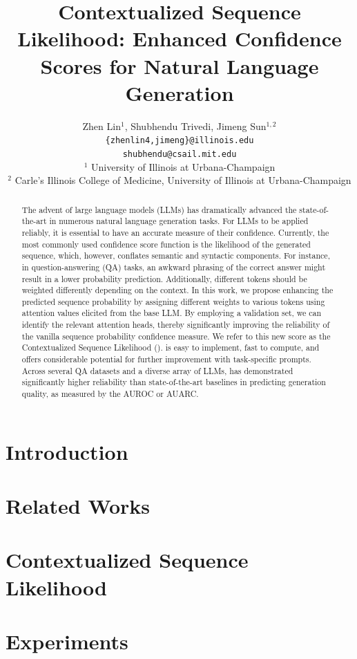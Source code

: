 \documentclass[11pt]{article}
\title{Contextualized Sequence Likelihood: Enhanced Confidence Scores for Natural Language Generation}
\author{Zhen Lin$^{1}$, Shubhendu Trivedi, Jimeng Sun$^{1,2}$\\
  \texttt{\{zhenlin4,jimeng\}@illinois.edu} \\
  \texttt{shubhendu@csail.mit.edu}\\
  ${^1}$ University of Illinois at Urbana-Champaign\\
${^2}$ Carle’s Illinois College of Medicine, University of Illinois at Urbana-Champaign\\
}
\begin{document}
\maketitle
\begin{abstract}
The advent of large language models (LLMs) has dramatically advanced the state-of-the-art in numerous natural language generation tasks.
For LLMs to be applied reliably, it is essential to have an accurate measure of their confidence.
Currently, the most commonly used confidence score function is the likelihood of the generated sequence, which, however, conflates semantic and syntactic components.
For instance, in question-answering (QA) tasks, an awkward phrasing of the correct answer might result in a lower probability prediction. 
Additionally, different tokens should be weighted differently depending on the context.
In this work, we propose enhancing the predicted sequence probability by assigning different weights to various tokens using attention values elicited from the base LLM.
By employing a validation set, we can identify the relevant attention heads, thereby significantly improving the reliability of the vanilla sequence probability confidence measure.
We refer to this new score as the Contextualized Sequence Likelihood (\methodname).
\methodname is easy to implement, fast to compute, and offers considerable potential for further improvement with task-specific prompts.
Across several QA datasets and a diverse array of LLMs, \methodname has demonstrated significantly higher reliability than state-of-the-art baselines in predicting generation quality, as measured by the AUROC or AUARC.
\end{abstract}

\section{Introduction}\label{sec:intro}



\section{Related Works}\label{sec:related}



\section{Contextualized Sequence Likelihood}\label{sec:method}


\section{Experiments}\label{sec:exp}

\end{document}
